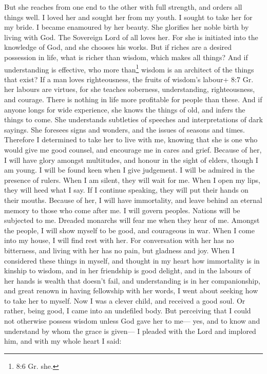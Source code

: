  But she reaches from one end to the other with full
strength, and orders all things well.  I loved her and
sought her from my youth. I sought to take her for my bride. I became
enamoured by her beauty.  She glorifies her noble birth by
living with God. The Sovereign Lord of all loves her.  For
she is initiated into the knowledge of God, and she chooses his works.
 But if riches are a desired possession in life, what is
richer than wisdom, which makes all things?  And if
understanding is effective, who more than\footnote{8:6 Gr. she.} wisdom
is an architect of the things that exist?  If a man loves
righteousness, the fruits of wisdom's labour+ 8:7 Gr. her labours are
virtues, for she teaches soberness, understanding, righteousness, and
courage. There is nothing in life more profitable for people than these.
 And if anyone longs for wide experience, she knows the
things of old, and infers the things to come. She understands subtleties
of speeches and interpretations of dark sayings. She foresees signs and
wonders, and the issues of seasons and times.  Therefore I
determined to take her to live with me, knowing that she is one who
would give me good counsel, and encourage me in cares and grief.
 Because of her, I will have glory amongst multitudes, and
honour in the sight of elders, though I am young.  I will
be found keen when I give judgement. I will be admired in the presence
of rulers.  When I am silent, they will wait for me. When I
open my lips, they will heed what I say. If I continue speaking, they
will put their hands on their mouths.  Because of her, I
will have immortality, and leave behind an eternal memory to those who
come after me.  I will govern peoples. Nations will be
subjected to me.  Dreaded monarchs will fear me when they
hear of me. Amongst the people, I will show myself to be good, and
courageous in war.  When I come into my house, I will find
rest with her. For conversation with her has no bitterness, and living
with her has no pain, but gladness and joy.  When I
considered these things in myself, and thought in my heart how
immortality is in kinship to wisdom,  and in her friendship
is good delight, and in the labours of her hands is wealth that doesn't
fail, and understanding is in her companionship, and great renown in
having fellowship with her words, I went about seeking how to take her
to myself.  Now I was a clever child, and received a good
soul.  Or rather, being good, I came into an undefiled
body.  But perceiving that I could not otherwise possess
wisdom unless God gave her to me--- yes, and to know and understand by
whom the grace is given--- I pleaded with the Lord and implored him, and
with my whole heart I said:

